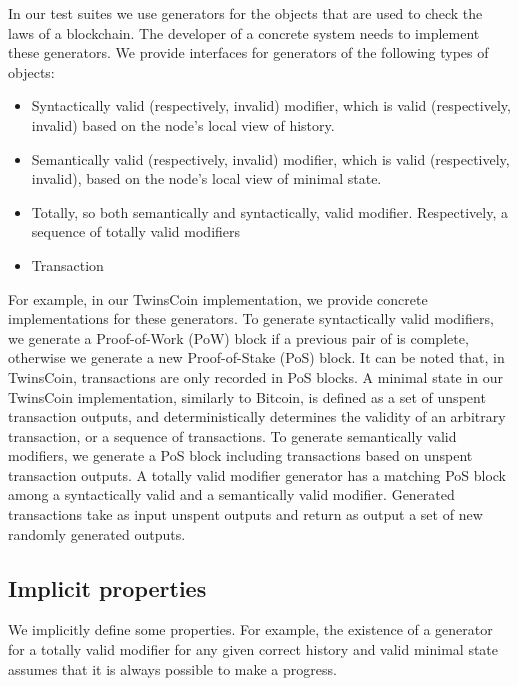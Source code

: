 In our test suites we use generators for the objects that are used to check the laws of a blockchain. The developer of a concrete system needs to implement these generators. We provide interfaces for generators of the following types of objects:

\begin{itemize}
	\item{Syntactically valid (respectively, invalid) modifier, which is valid (respectively, invalid) based on the node's local view of history.}
	\item{Semantically valid (respectively, invalid) modifier, which is valid (respectively, invalid), based on the node's local view of minimal state.}
	\item{Totally, so both semantically and syntactically, valid modifier. Respectively, a sequence of totally valid modifiers}
	\item{Transaction}
\end{itemize}

For example, in our TwinsCoin implementation, we provide concrete implementations for these generators. To generate syntactically valid modifiers, we generate a Proof-of-Work (PoW) block if a previous pair of {\em<PoW block, PoS block>} is complete, otherwise we generate a new Proof-of-Stake (PoS) block. It can be noted that, in TwinsCoin, transactions are only recorded in PoS blocks. A minimal state in our TwinsCoin implementation, similarly to Bitcoin, is defined as a set of unspent transaction outputs, and deterministically determines the validity of an arbitrary transaction, or a sequence of transactions. To generate semantically valid modifiers, we generate a PoS block including transactions based on unspent transaction outputs. A totally valid modifier generator has a matching PoS block among a syntactically valid and a semantically valid modifier. Generated transactions take as input unspent outputs and return as output a set of new randomly generated outputs.

\subsection{Implicit properties}

We implicitly define some properties. For example, the existence of a generator for a totally valid modifier for any given correct history and valid minimal state assumes that it is always possible to make a progress. 

